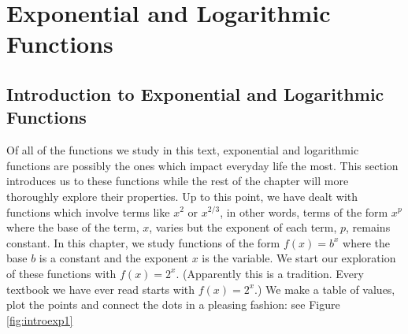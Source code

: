 \section{Exponential and Logarithmic Functions}
\subsection{Introduction to Exponential and Logarithmic Functions}

\label{IntroExpLogs}

Of all of the functions we study in this text, exponential and logarithmic functions are possibly the ones which impact everyday life the most.  This section introduces us to these functions while the rest of the chapter will more thoroughly explore their properties.  Up to this point, we have dealt with functions which involve terms like $x^2$ or $x^{2/3}$, in other words, terms of the form  $x^{p}$ where the base of the term, $x$, varies but the exponent of each term, $p$, remains constant.  In this chapter, we study functions of the form $f(x) = b^{x}$ where the base $b$ is a constant and the exponent $x$ is the variable.  We start our exploration of these functions with $f(x) = 2^{x}$. (Apparently this is a tradition.  Every textbook we have ever read starts with $f(x) = 2^{x}$.) We make a table of values, plot the points and connect the dots in a pleasing fashion: see Figure \ref{fig:introexp1}



